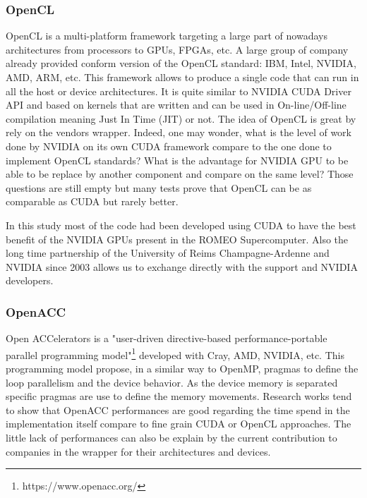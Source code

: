 \subsubsection{OpenCL}
OpenCL is a multi-platform framework targeting a large part of nowadays architectures from processors to GPUs, FPGAs, etc.
A large group of company already provided conform version of the OpenCL standard: IBM, Intel, NVIDIA, AMD, ARM, etc.
This framework allows to produce a single code that can run in all the host or device architectures. 
It is quite similar to NVIDIA CUDA Driver API and based on kernels that are written and can be used in On-line/Off-line compilation meaning Just In Time (JIT) or not. 
The idea of OpenCL is great by rely on the vendors wrapper.
Indeed, one may wonder, what is the level of work done by NVIDIA on its own CUDA framework compare to the one done to implement OpenCL standards? 
What is the advantage for NVIDIA GPU to be able to be replace by another component and compare on the same level? 
Those questions are still empty but many tests prove that OpenCL can be as comparable as CUDA but rarely better\cite{karimi2010performance,fang2011comprehensive}. 

In this study most of the code had been developed using CUDA to have the best benefit of the NVIDIA GPUs present in the ROMEO Supercomputer. 
Also the long time partnership of the University of Reims Champagne-Ardenne and NVIDIA since 2003 allows us to exchange directly with the support and NVIDIA developers. 

\subsubsection{OpenACC}
Open ACCelerators is a "user-driven directive-based performance-portable parallel programming model"\footnote{https://www.openacc.org/} developed with Cray, AMD, NVIDIA, etc.
This programming model propose, in a similar way to OpenMP, pragmas to define the loop parallelism and the device behavior. 
As the device memory is separated specific pragmas are use to define the memory movements.
Research works\cite{wienke2012openacc} tend to show that OpenACC performances are good regarding the time spend in the implementation itself compare to fine grain CUDA or OpenCL approaches. 
The little lack of performances can also be explain by the current contribution to companies in the wrapper for their architectures and devices. 

